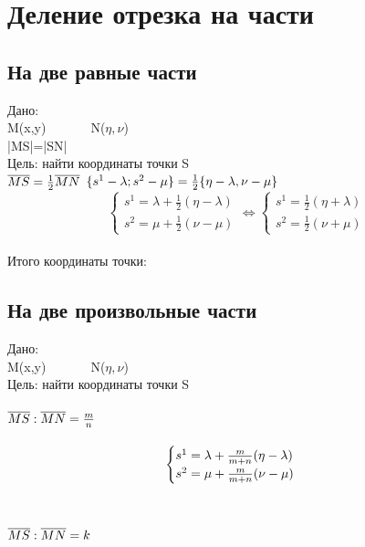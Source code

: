 \documentclass{article}
\begin{document}
\section{Деление отрезка на части}
\subsection{На две равные части}
Дано:\\
M(x,y)\ \ \ \ \ \ \ N($\eta,\nu$)\\
|MS|=|SN|\\
Цель: найти координаты точки S\\
$\overline{MS}=\frac{1}{2}\overline{MN}\\$
$\{s^1-\lambda;s^2-\mu\}=\frac{1}{2}\{\eta-\lambda,\nu-\mu\}\\$
\begin{equation}
    \begin{cases}
      s^1=\lambda+\frac{1}{2}(\eta-\lambda)\\
      s^2=\mu+\frac{1}{2}(\nu-\mu)
    \end{cases}
\Leftrightarrow
    \begin{cases}
        s^1=\frac{1}{2}(\eta+\lambda)\\
        s^2=\frac{1}{2}(\nu+\mu)
      \end{cases}
\end{equation}\\
Итого координаты точки:
\subsection{На две произвольные части}
Дано:\\
M(x,y)\ \ \ \ \ \ \ N($\eta,\nu$)\\
Цель: найти координаты точки S\\
\paragraph{$\overline{MS}:\overline{MN}=\frac{m}{n}\\$}
\begin{equation}
    \centering
    \begin{cases}
      s^1=\lambda+\frac{m}{m+n}(\eta-\lambda)\\
      s^2=\mu+\frac{m}{m+n}(\nu-\mu)
    \end{cases}
\end{equation}\\
\paragraph{$\overline{MS}:\overline{MN}=k\\$}
\\
\end{document}
